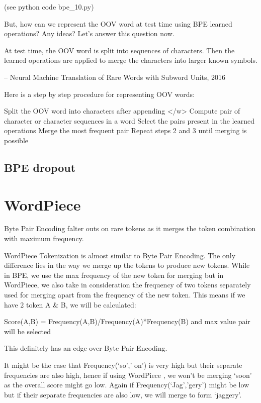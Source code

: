 (see python code bpe\_10.py)

But, how can we represent the OOV word at test time using BPE learned operations? Any ideas? Let’s answer this question now.

    At test time, the OOV word is split into sequences of characters. Then the learned operations are applied to merge the characters into larger known symbols.

    – Neural Machine Translation of Rare Words with Subword Units, 2016

Here is a step by step procedure for representing OOV words:

    Split the OOV word into characters after appending </w>
    Compute pair of character or character sequences in a word
    Select the pairs present in the learned operations
    Merge the most frequent pair
    Repeat steps 2 and 3 until merging is possible

\subsection{BPE dropout}

\section{WordPiece}

Byte Pair Encoding falter outs on rare tokens as it merges the token combination with maximum frequency.

WordPiece Tokenization is almost similar to Byte Pair Encoding. The only difference lies in the way we merge up the tokens to produce new tokens. While in BPE, we use the max frequency of the new token for merging but in WordPiece, we also take in consideration the frequency of two tokens separately used for merging apart from the frequency of the new token. This means if we have 2 token A \& B, we will be calculated:

Score(A,B) = Frequency(A,B)/Frequency(A)*Frequency(B) and max value pair will be selected

This definitely has an edge over Byte Pair Encoding.

It might be the case that Frequency(‘so’,’ on’) is very high but their separate frequencies are also high, hence if using WordPiece , we won’t be merging ‘soon’ as the overall score might go low. Again if Frequency(‘Jag’,’gery’) might be low but if their separate frequencies are also low, we will merge to form ‘jaggery’.

